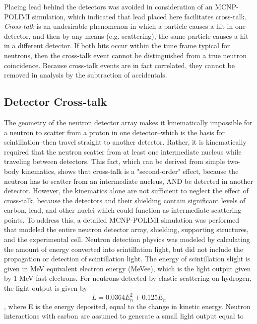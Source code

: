 Placing lead behind the detectors was avoided in consideration of an MCNP-POLIMI simulation, which indicated that lead placed here facilitates cross-talk. \textit{Cross-talk} is an undesirable phenomenon in which a particle causes a hit in one detector, and then by any means (e.g.  scattering), the same particle causes a hit in a different detector.
If both hits occur within the time frame typical for neutrons, then the cross-talk event cannot be distinguished from a true neutron coincidence.
Because cross-talk events are in fact correlated, they cannot be removed in analysis by the subtraction of accidentals.

\subsection{Detector Cross-talk}
The geometry of the neutron detector array makes it kinematically impossible for a neutron to scatter from a proton in one detector--which is the basis for scintillation--then travel straight to another detector.
Rather, it is kinematically required that the neutron scatter from at least one intermediate nucleus while traveling between detectors.
This fact, which can be derived from simple two-body kinematics, shows that cross-talk is a "second-order" effect, because the neutron has to scatter from an intermediate nucleus, AND be detected in another detector.
However, the kinematics alone are not sufficient to neglect the effect of cross-talk, because the detectors and their shielding contain significant levels of carbon, lead, and other nuclei which could function as intermediate scattering points.
To address this, a detailed MCNP-POLIMI simulation was performed that modeled the entire neutron detector array, shielding, supporting structures, and the experimental cell.
Neutron detection physics was modeled by calculating the amount of energy converted into scintillation light, but did not include the propagation or detection of scintillation light.
The energy of scintillation slight is given in MeV equivalent electron energy (MeVee), which is the light output given by 1 MeV fast electrons.
For neutrons detected by elastic scattering on hydrogen, the light output is given by
\begin{displaymath}
L = 0.0364 E_n^2 +  0.125 E_n
\end{displaymath}
, where E is the energy deposited, equal to the change in kinetic energy.
Neutron interactions with carbon are assumed to generate a small light output equal to
